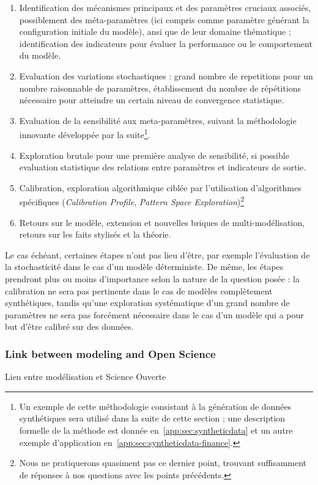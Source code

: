 \begin{enumerate}
	\item Identification des mécanismes principaux et des paramètres cruciaux associés, possiblement des méta-paramètres (ici compris comme paramètre générant la configuration initiale du modèle), ansi que de leur domaine thématique ; identification des indicateurs pour évaluer la performance ou le comportement du modèle.
	\item Evaluation des variations stochastiques : grand nombre de repetitions pour un nombre raisonnable de paramètres, établissement du nombre de répétitions nécessaire pour atteindre un certain niveau de convergence statistique.
	\item Evaluation de la sensibilité aux meta-paramètres, suivant la méthodologie innovante développée par la suite\footnote{Un exemple de cette méthodologie consistant à la génération de données synthétiques sera utilisé dans la suite de cette section ; une description formelle de la méthode est donnée en~\ref{app:sec:syntheticdata} et un autre exemple d'application en~\ref{app:sec:syntheticdata-finance}.}.
	\item Exploration brutale pour une première analyse de sensibilité, si possible evaluation statistique des relations entre paramètres et indicateurs de sortie.
	\item Calibration, exploration algorithmique ciblée par l'utilisation d'algorithmes spécifiques (\emph{Calibration Profile}, \emph{Pattern Space Exploration})\footnote{Nous ne pratiquerons quasiment pas ce dernier point, trouvant suffisamment de réponses à nos questions avec les points précédents.}
	\item Retours sur le modèle, extension et nouvelles briques de multi-modélisation, retours sur les faits stylisés et la théorie.
\end{enumerate}

Le cas échéant, certaines étapes n'ont pas lieu d'être, par exemple l'évaluation de la stochasticité dans le cas d'un modèle déterministe. De même, les étapes prendront plus ou moins d'importance selon la nature de la question posée : la calibration ne sera pas pertinente dans le cas de modèles complètement synthétiques, tandis qu'une exploration systématique d'un grand nombre de paramètres ne sera pas forcément nécessaire dans le cas d'un modèle qui a pour but d'être calibré sur des données.



\subsubsection{Link between modeling and Open Science}{Lien entre modélisation et Science Ouverte}



